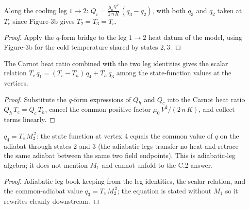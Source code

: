 \begin{lemma}
\label{lem:IPhO2026Problems_problem_IPhO_2026_3_C_2:Qc_eq}
Along the cooling leg $1 \to 2$:
$Q_c = \frac{\mu_0\,V^2}{2\,n\,K}\,(q_3 - q_2)$, with both $q_3$ and
$q_2$ taken at $T_c$ since Figure-3b gives $T_2 = T_3 = T_c$.
\end{lemma}
\begin{proof}
Apply the $q$-form bridge to the leg $1 \to 2$ heat datum of the
model, using Figure-3b for the cold temperature shared by states
$2, 3$.
\end{proof}

\begin{lemma}
\label{lem:IPhO2026Problems_problem_IPhO_2026_3_C_2:q_relation}
The Carnot heat ratio combined with the two leg identities gives the
scalar relation
$T_c\,q_1 = (T_c - T_h)\,q_4 + T_h\,q_3$
among the state-function values at the vertices.
\end{lemma}
\begin{proof}
Substitute the $q$-form expressions of $Q_h$ and $Q_c$ into the
Carnot heat ratio $Q_h\,T_c = Q_c\,T_h$, cancel the common positive
factor $\mu_0\,V^2/(2\,n\,K)$, and collect terms linearly.
\end{proof}

\begin{lemma}
\label{lem:IPhO2026Problems_problem_IPhO_2026_3_C_2:q4_eq_adiabatic_41}
$q_4 = T_c\,M_2^{\,2}$: the state function at vertex $4$ equals the
common value of $q$ on the adiabat through states $2$ and $3$ (the
adiabatic legs transfer no heat and retrace the same adiabat between
the same two field endpoints). This is adiabatic-leg algebra; it does
not mention $M_1$ and cannot unfold to the C.2 answer.
\end{lemma}
\begin{proof}
Adiabatic-leg book-keeping from the leg identities, the scalar
relation, and the common-adiabat value $q_3 = T_c\,M_2^{\,2}$; the
equation is stated without $M_1$ so it rewrites cleanly downstream.
\end{proof}

